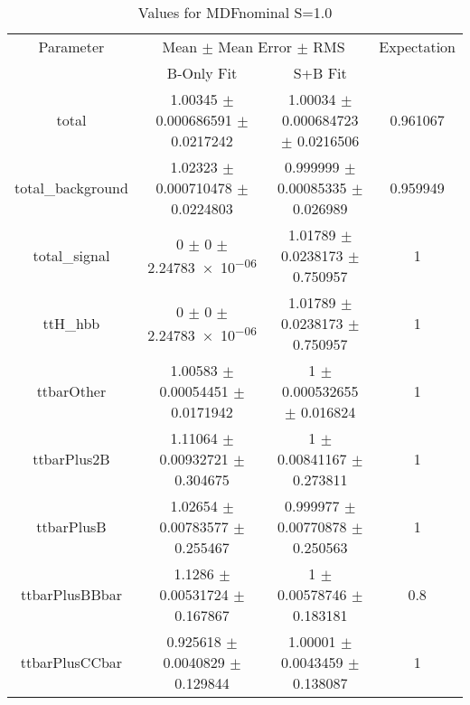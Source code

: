 \begin{table}
\centering
\caption{Values for MDFnominal S=1.0}
\begin{tabular}{cccc}
\toprule
Parameter & \multicolumn{2}{c}{Mean $\pm$ Mean Error $\pm$ RMS} & Expectation\\
 & B-Only Fit & S+B Fit & \\
\midrule
total & \num{1.00345} $\pm$ \num{0.000686591} $\pm$ \num{0.0217242} & \num{1.00034} $\pm$ \num{0.000684723} $\pm$ \num{0.0216506} & \num{0.961067}\\
total\_background & \num{1.02323} $\pm$ \num{0.000710478} $\pm$ \num{0.0224803} & \num{0.999999} $\pm$ \num{0.00085335} $\pm$ \num{0.026989} & \num{0.959949}\\
total\_signal & \num{0} $\pm$ \num{0} $\pm$ \num{2.24783e-06} & \num{1.01789} $\pm$ \num{0.0238173} $\pm$ \num{0.750957} & \num{1}\\
ttH\_hbb & \num{0} $\pm$ \num{0} $\pm$ \num{2.24783e-06} & \num{1.01789} $\pm$ \num{0.0238173} $\pm$ \num{0.750957} & \num{1}\\
ttbarOther & \num{1.00583} $\pm$ \num{0.00054451} $\pm$ \num{0.0171942} & \num{1} $\pm$ \num{0.000532655} $\pm$ \num{0.016824} & \num{1}\\
ttbarPlus2B & \num{1.11064} $\pm$ \num{0.00932721} $\pm$ \num{0.304675} & \num{1} $\pm$ \num{0.00841167} $\pm$ \num{0.273811} & \num{1}\\
ttbarPlusB & \num{1.02654} $\pm$ \num{0.00783577} $\pm$ \num{0.255467} & \num{0.999977} $\pm$ \num{0.00770878} $\pm$ \num{0.250563} & \num{1}\\
ttbarPlusBBbar & \num{1.1286} $\pm$ \num{0.00531724} $\pm$ \num{0.167867} & \num{1} $\pm$ \num{0.00578746} $\pm$ \num{0.183181} & \num{0.8}\\
ttbarPlusCCbar & \num{0.925618} $\pm$ \num{0.0040829} $\pm$ \num{0.129844} & \num{1.00001} $\pm$ \num{0.0043459} $\pm$ \num{0.138087} & \num{1}\\
\bottomrule
\end{tabular}
\end{table}
